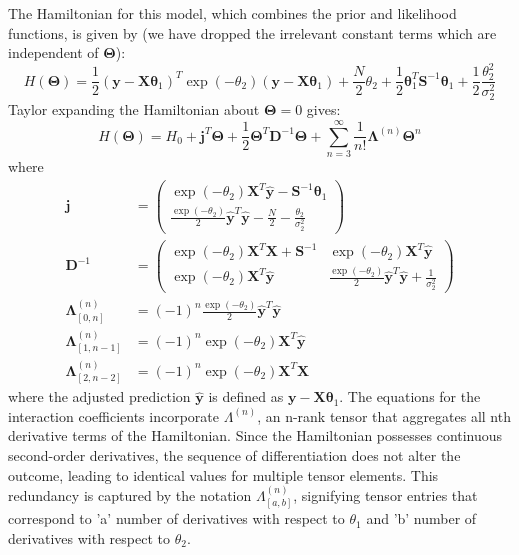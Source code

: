 \documentclass[letterpaper,12pt]{article}
\begin{document}
\vspace*{0.5cm}
The Hamiltonian for this model, which combines the prior and likelihood functions, is given by
(we have dropped the irrelevant constant terms which are independent of $\bm{\Theta}$):
\begin{equation}
    H(\bm{\Theta}) = \frac{1}{2}(\bm{y} - \bm{X}\bm{\theta}_{1})^{T}\exp(-\theta_{2})(\bm{y} - \bm{X}\bm{\theta}_{1}) + \frac{N}{2}\theta_{2} + \frac{1}{2}\bm{\theta}_{1}^{T}\bm{S}^{-1}\bm{\theta}_{1} + \frac{1}{2}\frac{\theta_{2}^{2}}{\sigma_{2}^{2}}
\end{equation}
Taylor expanding the Hamiltonian about $\bm{\Theta} = 0$ gives:
\begin{equation}
    H(\bm{\Theta}) = H_{0} + \bm{j}^{T}\bm{\Theta} + \frac{1}{2}\bm{\Theta}^{T}\bm{D}^{-1}\bm{\Theta} + \sum_{n=3}^{\infty} \frac{1}{n!}\bm{\Lambda}^{(n)}\bm{\Theta}^{n}
\end{equation}
where
\begin{align*}
    \bm{j} &= \begin{pmatrix}
        \exp(-\theta_{2})\bm{X}^{T}\hat{\bm{y}} - \bm{S}^{-1}\bm{\theta}_{1} \\
        \frac{\exp(-\theta_{2})}{2}\hat{\bm{y}}^{T}\hat{\bm{y}} - \frac{N}{2} - \frac{\theta_{2}}{\sigma_{2}^{2}}
    \end{pmatrix} \\
    \bm{D}^{-1} &= \begin{pmatrix}
        \exp(-\theta_{2})\bm{X}^{T}\bm{X} + \bm{S}^{-1} & \exp(-\theta_{2})\bm{X}^{T}\hat{\bm{y}} \\
        \exp(-\theta_{2})\bm{X}^{T}\hat{\bm{y}} & \frac{\exp(-\theta_{2})}{2}\hat{\bm{y}}^{T}\hat{\bm{y}} + \frac{1}{\sigma_{2}^{2}}
    \end{pmatrix} \\
    \bm{\Lambda}^{(n)}_{[0,n]} &= (-1)^{n}\frac{\exp(-\theta_{2})}{2}\hat{\bm{y}}^{T}\hat{\bm{y}} \\
    \bm{\Lambda}^{(n)}_{[1,n-1]} &= (-1)^{n}\exp(-\theta_{2})\bm{X}^{T}\hat{\bm{y}} \\
    \bm{\Lambda}^{(n)}_{[2,n-2]} &= (-1)^{n}\exp(-\theta_{2})\bm{X}^{T}\bm{X} 
\end{align*}
where the adjusted prediction $\hat{\bm{y}}$ is defined as $\bm{y} - \bm{X}\bm{\theta}_{1}$. 
The equations for the interaction coefficients incorporate $\Lambda^{(n)}$, an n-rank tensor that aggregates all nth derivative terms of the Hamiltonian. 
Since the Hamiltonian possesses continuous second-order derivatives, the sequence of differentiation does not alter the outcome, leading to identical values for multiple tensor elements. 
This redundancy is captured by the notation $\Lambda^{(n)}_{[a, b]}$, signifying tensor entries that correspond to 'a' number of derivatives with respect to $\theta_{1}$ and 'b' number of derivatives with respect to $\theta_{2}$.
\end{document}
